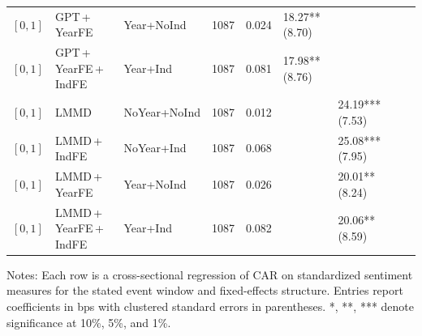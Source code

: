 \begin{table}[p]
\begin{tabular}{lllrrllll}
$[0,1]$ & GPT\,+\,YearFE & Year+NoInd & 1087 & 0.024 & 18.27** (8.70) &  &  &  \\
$[0,1]$ & GPT\,+\,YearFE\,+\,IndFE & Year+Ind & 1087 & 0.081 & 17.98** (8.76) &  &  &  \\
$[0,1]$ & LMMD & NoYear+NoInd & 1087 & 0.012 &  & 24.19*** (7.53) &  &  \\
$[0,1]$ & LMMD\,+\,IndFE & NoYear+Ind & 1087 & 0.068 &  & 25.08*** (7.95) &  &  \\
$[0,1]$ & LMMD\,+\,YearFE & Year+NoInd & 1087 & 0.026 &  & 20.01** (8.24) &  &  \\
$[0,1]$ & LMMD\,+\,YearFE\,+\,IndFE & Year+Ind & 1087 & 0.082 &  & 20.06** (8.59) &  &  \\
\bottomrule
\end{tabular}
\parbox{0.95\linewidth}{\footnotesize Notes: Each row is a cross-sectional regression of CAR on standardized sentiment measures for the stated event window and fixed-effects structure. Entries report coefficients in bps with clustered standard errors in parentheses. *, **, *** denote significance at 10\%, 5\%, and 1\%.}
\end{table}